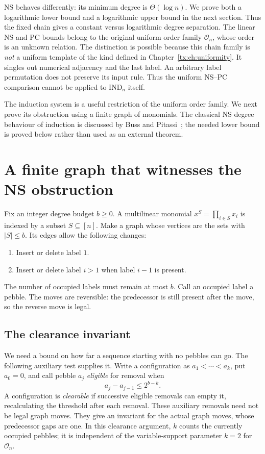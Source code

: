 NS behaves differently: its minimum degree is $\Theta(\log n)$.
We prove both a logarithmic lower bound and a logarithmic upper bound
in the next section. Thus the fixed chain gives a constant versus
logarithmic degree separation. The linear NS and PC bounds belong
to the original uniform order family $\mathcal O_n$, whose order is
an unknown relation. The distinction is possible because this chain family is
\emph{not} a uniform template of the kind defined in Chapter~\ref{tx:ch:uniformity}.
It singles out numerical adjacency and the last label. An arbitrary
label permutation does not preserve its input rule. Thus the uniform
NS--PC comparison cannot be applied to $\mathrm{IND}_n$ itself.

The induction system is a useful restriction of the uniform order
family. We next prove its obstruction using a finite graph of
monomials. The classical NS degree behaviour of induction is discussed
by Buss and Pitassi~\cite{BussPitassiInduction}; the needed lower bound
is proved below rather than used as an external theorem.

\section{A finite graph that witnesses the NS obstruction}
Fix an integer degree budget $b\ge0$. A multilinear monomial
$x^S=\prod_{i\in S}x_i$ is indexed by a subset $S\subseteq[n]$.
Make a graph whose vertices are the sets with $|S|\le b$. Its edges
allow the following changes:
\begin{enumerate}
\item Insert or delete label $1$.
\item Insert or delete label $i>1$ when label $i-1$ is present.
\end{enumerate}
The number of occupied labels must remain at most $b$. Call an occupied
label a pebble. The moves are reversible: the predecessor is still
present after the move, so the reverse move is legal.

\subsection{The clearance invariant}
We need a bound on how far a sequence starting with no pebbles can go.
The following auxiliary test supplies it. Write a configuration as
$a_1<\cdots<a_k$, put $a_0=0$, and call pebble $a_j$ \emph{eligible}
for removal when
\begin{equation}\label{tx:eq:order-clearance-test}
                        a_j-a_{j-1}\le2^{b-k}.
\end{equation}
A configuration is \emph{clearable} if successive eligible removals
can empty it, recalculating the threshold after each removal.
These auxiliary removals need not be legal graph moves. They give an
invariant for the actual graph moves, whose predecessor gaps are one.
In this clearance argument, $k$ counts the currently occupied pebbles;
it is independent of the variable-support parameter $k=2$ for
$\mathcal O_n$.

